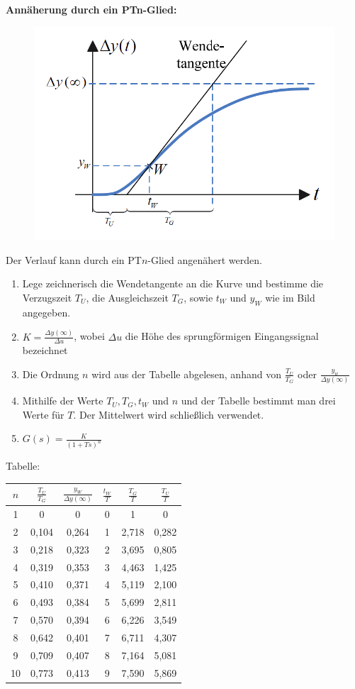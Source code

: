 \documentclass[10pt,a4paper]{article}
\begin{document}
\textbf{Annäherung durch ein PTn-Glied:} \\
\begin{figure}[H]
	\includegraphics[width = 0.4\columnwidth]{imgs/modellidentifikation_2.png}
\end{figure}
Der Verlauf kann durch ein PT$n$-Glied angenähert werden.
\begin{enumerate}
	\item Lege zeichnerisch die Wendetangente an die Kurve und bestimme die Verzugszeit $T_U$, die Ausgleichszeit $T_G$, sowie $t_W$ und $y_W$ wie im Bild angegeben.
	\item $K = \frac{\Delta y(∞)}{\Delta u}$, wobei $\Delta u$ die Höhe des sprungförmigen Eingangssignal bezeichnet
	\item Die Ordnung $n$ wird aus der Tabelle abgelesen, anhand von $\frac{T_U}{T_G}$ oder $\frac{y_w}{\Delta y(∞)}$
	\item Mithilfe der Werte $T_U, T_G, t_W$ und $n$ und der Tabelle bestimmt man drei Werte für $T$. Der Mittelwert wird schließlich verwendet.	
	\item $G(s) = \frac{K}{(1 + Ts)^n}$
\end{enumerate}

Tabelle: \\
\begin{tabular}{|c|c|c|c|c|c|}
	\hline
	$n$ & $\frac{T_U}{T_G}$ & $\frac{y_W}{\Delta y(∞)}$ & $\frac{t_W}{T}$ & $\frac{T_G}{T}$ & $\frac{T_U}{T}$ \\
	\hline
	1 & 0 & 0 & 0 & 1 & 0 \\
	\hline
	2 & 0,104 & 0,264 & 1 & 2,718 & 0,282 \\
	\hline
	3 & 0,218 & 0,323 & 2 & 3,695 & 0,805 \\
	\hline
	4 & 0,319 & 0,353 & 3 & 4,463 & 1,425 \\
	\hline
	5 & 0,410 & 0,371 & 4 & 5,119 & 2,100 \\
	\hline
	6 & 0,493 & 0,384 & 5 & 5,699 & 2,811 \\
	\hline
	7 & 0,570 & 0,394 & 6 & 6,226 & 3,549 \\
	\hline
	8 & 0,642 & 0,401 & 7 & 6,711 & 4,307 \\
	\hline
	9 & 0,709 & 0,407 & 8 & 7,164 & 5,081 \\
	\hline
	10 & 0,773 & 0,413 & 9 & 7,590 & 5,869 \\
	\hline
\end{tabular}
\end{document}
